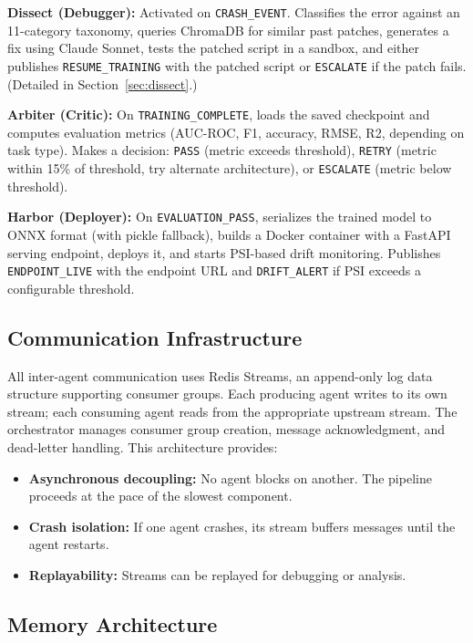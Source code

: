 \documentclass[conference]{IEEEtran}
\begin{document}
\textbf{Dissect (Debugger):} Activated on \texttt{CRASH\_EVENT}. Classifies the error
against an 11-category taxonomy, queries ChromaDB for similar past patches, generates a
fix using Claude Sonnet, tests the patched script in a sandbox, and either publishes
\texttt{RESUME\_TRAINING} with the patched script or \texttt{ESCALATE} if the patch
fails. (Detailed in Section~\ref{sec:dissect}.)

\textbf{Arbiter (Critic):} On \texttt{TRAINING\_COMPLETE}, loads the saved checkpoint
and computes evaluation metrics (AUC-ROC, F1, accuracy, RMSE, R2, depending on task
type). Makes a decision: \texttt{PASS} (metric exceeds threshold), \texttt{RETRY} (metric
within 15\% of threshold, try alternate architecture), or \texttt{ESCALATE} (metric below
threshold).

\textbf{Harbor (Deployer):} On \texttt{EVALUATION\_PASS}, serializes the trained model
to ONNX format (with pickle fallback), builds a Docker container with a FastAPI serving
endpoint, deploys it, and starts PSI-based drift monitoring. Publishes
\texttt{ENDPOINT\_LIVE} with the endpoint URL and \texttt{DRIFT\_ALERT} if PSI exceeds a
configurable threshold.

\subsection{Communication Infrastructure}

All inter-agent communication uses Redis Streams, an append-only log data structure
supporting consumer groups. Each producing agent writes to its own stream; each consuming
agent reads from the appropriate upstream stream. The orchestrator manages consumer group
creation, message acknowledgment, and dead-letter handling. This architecture provides:

\begin{itemize}
  \item \textbf{Asynchronous decoupling:} No agent blocks on another. The pipeline
  proceeds at the pace of the slowest component.
  \item \textbf{Crash isolation:} If one agent crashes, its stream buffers messages until
  the agent restarts.
  \item \textbf{Replayability:} Streams can be replayed for debugging or analysis.
\end{itemize}

\subsection{Memory Architecture}
\end{document}

